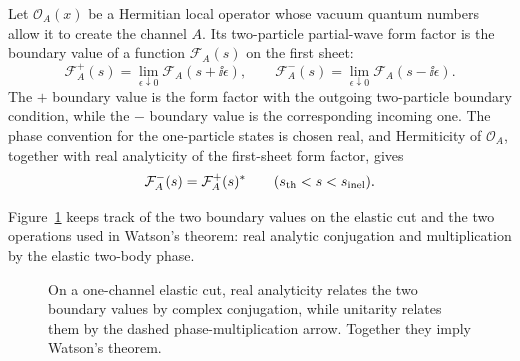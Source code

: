 Let \(\mathcal O_A(x)\) be a Hermitian local operator whose vacuum quantum
numbers allow it to create the channel \(A\).  Its two-particle partial-wave
form factor is the boundary value of a function \(\mathcal F_A(s)\) on the
first sheet:
\[
  \mathcal F_A^+(s)=\lim_{\epsilon\downarrow0}
  \mathcal F_A(s+\ii\epsilon),
  \qquad
  \mathcal F_A^-(s)=\lim_{\epsilon\downarrow0}
  \mathcal F_A(s-\ii\epsilon).
\]
The \(+\) boundary value is the form factor with the outgoing two-particle
boundary condition, while the \(-\) boundary value is the corresponding
incoming one.  The phase convention for the one-particle states is chosen
real, and Hermiticity of \(\mathcal O_A\), together with real analyticity of
the first-sheet form factor, gives
\begin{equation}
  \mathcal F_A^-(s)=\mathcal F_A^+(s)^*
  \qquad(s_{\rm th}<s<s_{\rm inel}).
  \label{eq:watson-real-analytic-form-factor}
\end{equation}

Figure~\ref{fig:watson-elastic-form-factor-cut} keeps track of the two boundary
values on the elastic cut and the two operations used in Watson's theorem: real
analytic conjugation and multiplication by the elastic two-body phase.

\begin{figure}[!ht]
  \centering
  \caption[Watson theorem boundary values on an elastic cut]{On a
  one-channel elastic cut, real analyticity relates the two
  boundary values by complex conjugation, while unitarity relates them by the
  dashed phase-multiplication arrow.  Together they imply Watson's theorem.}
  \label{fig:watson-elastic-form-factor-cut}
\end{figure}

